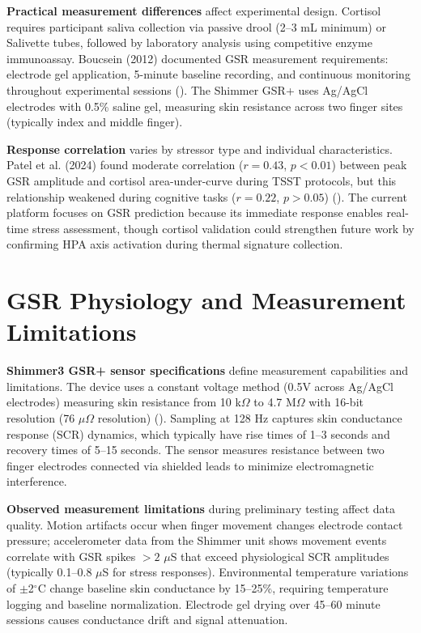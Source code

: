 \textbf{Practical measurement differences} affect experimental design. Cortisol requires participant saliva collection via passive drool (2--3 mL minimum) or Salivette tubes, followed by laboratory analysis using competitive enzyme immunoassay. Boucsein (2012) documented GSR measurement requirements: electrode gel application, 5-minute baseline recording, and continuous monitoring throughout experimental sessions (\citep{ref1}). The Shimmer GSR+ uses Ag/AgCl electrodes with 0.5\% saline gel, measuring skin resistance across two finger sites (typically index and middle finger).

\textbf{Response correlation} varies by stressor type and individual characteristics. Patel et al. (2024) found moderate correlation ($r = 0.43$, $p < 0.01$) between peak GSR amplitude and cortisol area-under-curve during TSST protocols, but this relationship weakened during cognitive tasks ($r = 0.22$, $p > 0.05$) (\citep{ref7}). The current platform focuses on GSR prediction because its immediate response enables real-time stress assessment, though cortisol validation could strengthen future work by confirming HPA axis activation during thermal signature collection.


\section{GSR Physiology and Measurement Limitations}
\textbf{Shimmer3 GSR+ sensor specifications} define measurement capabilities and limitations. The device uses a constant voltage method (0.5V across Ag/AgCl electrodes) measuring skin resistance from 10 k$\Omega$ to 4.7 M$\Omega$ with 16-bit resolution (76 $\mu\Omega$ resolution) (\citep{ref8}). Sampling at 128 Hz captures skin conductance response (SCR) dynamics, which typically have rise times of 1--3 seconds and recovery times of 5--15 seconds. The sensor measures resistance between two finger electrodes connected via shielded leads to minimize electromagnetic interference.

\textbf{Observed measurement limitations} during preliminary testing affect data quality. Motion artifacts occur when finger movement changes electrode contact pressure; accelerometer data from the Shimmer unit shows movement events correlate with GSR spikes $>2$ $\mu$S that exceed physiological SCR amplitudes (typically 0.1--0.8 $\mu$S for stress responses). Environmental temperature variations of $\pm$2$^\circ$C change baseline skin conductance by 15--25\%, requiring temperature logging and baseline normalization. Electrode gel drying over 45--60 minute sessions causes conductance drift and signal attenuation.


